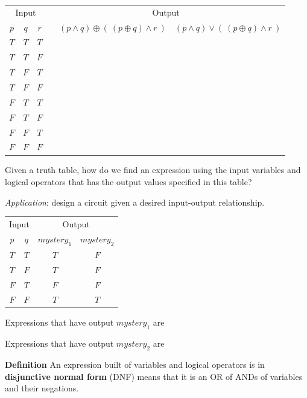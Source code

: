\documentclass[12pt, oneside]{article}
\begin{document}
\begin{center}
    \begin{tabular}{ccc||p{3in}|c|c}
    \multicolumn{3}{c||}{Input}  & \multicolumn{3}{c}{Output} \\
    $p$ & $q$ & $r$  &  &  $(p \land q) \oplus (~ ( p \oplus q) \land r~)$ & $(p \land q) \vee (~ ( p \oplus q) \land r~)$ \\
    \hline
    $T$ & $T$  & $T$ &   && \\
    $T$ & $T$  & $F$ &   && \\
    $T$ & $F$  & $T$ &   && \\
    $T$ & $F$  & $F$ &   && \\
    $F$ & $T$  & $T$ &   && \\
    $F$ & $T$  & $F$ &   && \\
    $F$ & $F$  & $T$ &   && \\
    $F$ & $F$  & $F$ &   && \\
    \end{tabular}
\end{center}
    \vfill \newpage


Given a truth table, how do we find an expression
using the input variables and logical operators that has the 
output values specified in this table?

{\it Application}: design a circuit given a desired input-output relationship.

\begin{center}
\begin{tabular}{cc||cc}
\multicolumn{2}{c||}{Input}  &\multicolumn{2}{c}{Output}\\
$p$ & $q$& $mystery_1$ & $mystery_2$\\
\hline
$T$ & $T$  & $T$ & $F$\\
$T$ & $F$  & $T$ & $F$\\
$F$ & $T$  & $F$ & $F$\\
$F$ & $F$  & $T$ & $T$\\
\end{tabular}
\end{center}


Expressions that have output $mystery_1$ are

\vspace{100pt}

Expressions that have output $mystery_2$ are

\vspace{100pt}
 

{\bf  Definition} An expression built of variables and logical 
operators is in {\bf disjunctive normal form}  (DNF) means
that it is an OR of ANDs of variables and their negations.
\end{document}
